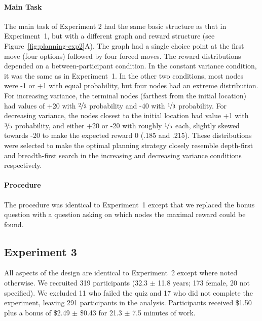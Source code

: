 \paragraph{Main Task}
The main task of Experiment 2 had the same basic structure as that in Experiment~1, but with a different graph and reward structure (see Figure~\ref{fig:planning-exp2}A). The graph had a single choice point at the first move (four options) followed by four forced moves. The reward distributions depended on a between-participant condition. In the constant variance condition, it was the same as in Experiment~1. In the other two conditions, most nodes were -1 or +1 with equal probability, but four nodes had an extreme distribution. For increasing variance, the terminal nodes (farthest from the initial location) had values of +20 with $\nicefrac{2}{3}$ probability and -40 with $\nicefrac{1}{3}$ probability. For decreasing variance, the nodes closest to the initial location had value +1 with $\nicefrac{3}{5}$ probability, and either +20 or -20 with roughly $\nicefrac{1}{5}$ each, slightly skewed towards -20 to make the expected reward 0 (.185 and .215). These distributions were selected to make the optimal planning strategy closely resemble depth-first and breadth-first search in the increasing and decreasing variance conditions respectively.

\paragraph{Procedure}
The procedure was identical to Experiment~1 except that we replaced the bonus question with a question asking on which nodes the maximal reward could be found.


\subsection{Experiment 3}\label{sec:planning-methods3}
All aspects of the design are identical to Experiment~2 except where noted otherwise. We recruited 319 participants (32.3 $\pm$ 11.8 years; 173 female, 20 not specified). We excluded 11 who failed the quiz and 17 who did not complete the experiment, leaving 291 participants in the analysis. Participants received \$1.50 plus a bonus of \$2.49 $\pm$ \$0.43 for 21.3 $\pm$ 7.5 minutes of work.

